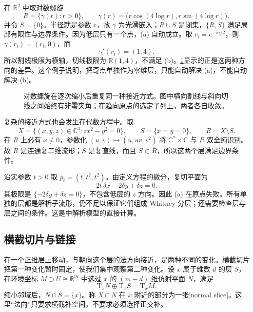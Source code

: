 \begin{example}\label{g2:exm:whitney-spiral}
	在 \(\mathbb R^2\) 中取对数螺旋
	\[
		R=\{\gamma(r):r>0\},\qquad
		\gamma(r)=\bigl(r\cos(4\log r),r\sin(4\log r)\bigr),
	\]
	并令 \(S=\{0\}\)。半径就是参数 \(r\)，故 \(\gamma\) 为光滑嵌入；\(R\cup S\) 是闭集，\(\{R,S\}\) 满足局部有限性与边界条件。因为低层只有一个点，(a) 自动成立。取 \(r_i=e^{-\pi i/2}\)，则 \(\gamma(r_i)=(r_i,0)\)，而
	\[
		\gamma'(r_i)=(1,4).
	\]
	所以割线极限为横轴，切线极限为 \(\mathbb R(1,4)\)，不满足 (b)。\cref{g2:fig:whitney-spiral}显示的正是这两种方向的差异。这个例子说明，把奇点单独作为零维层，只能自动解决 (a)，不能自动解决 (b)。
\end{example}

\begin{figure}[htbp]
	\centering
	
	\caption{对数螺旋在逐次缩小后重复同一种接近方式。图中横向割线与斜向切线之间始终有非零夹角；在趋向原点的选定子列上，两者各自收敛。}
	\label{g2:fig:whitney-spiral}
\end{figure}

\begin{example}\label{g2:exm:complex-umbrella-whitney-a}
	复杂的接近方式也会发生在代数方程中。取
	\[
		X=\{(x,y,z)\in\mathbb C^3:zx^2-y^2=0\},\qquad
		S=\{x=y=0\},\qquad R=X\setminus S.
	\]
	在 \(R\) 上必有 \(x\ne0\)，参数化 \((u,v)\mapsto(u,uv,v^2)\) 将 \(\mathbb C^*\times\mathbb C\) 与 \(R\) 双全纯识别。故 \(R\) 是连通复二维流形；\(S\) 是复直线，而且 \(S\subset\overline R\)，所以这两个层满足边界条件。

	沿实参数 \(t>0\) 取 \(p_t=(t,t^2,t^2)\)。由定义方程的微分，复切平面为
	\[
		2t\,\delta x-2\delta y+\delta z=0.
	\]
	其极限是 \(\{-2\delta y+\delta z=0\}\)，不包含低层的 \(z\) 方向。因此 (a) 在原点失败。所有单独的层都是解析子流形，仍不足以保证它们组成 Whitney 分层；还需要检查层与层之间的条件。这是\cite[第1节]{Mather2012TopologicalStability}中解析模型的直接计算。
\end{example}

\subsection{横截切片与链接}
\label{g2:subsec:B01:03}

在一个正维层上移动，与朝向这个层的法方向接近，是两种不同的变化。横截切片把第一种变化暂时固定，使我们集中观察第二种变化。设 \(x\) 属于维数 \(d\) 的层 \(S\)，在环境坐标 \(M\supset U\cong\mathbb R^m\) 中选过 \(x\) 的 \((m-d)\) 维仿射平面 \(N\)，满足
\[
	\mathrm T_xN\oplus\mathrm T_xS=\mathrm T_xM.
\]
缩小邻域后，\(N\cap S=\{x\}\)。称 \(X\cap N\) 在 \(x\) 附近的部分为一张[normal slice]。这里“法向”只要求横截补空间，不要求必须选择正交补。

